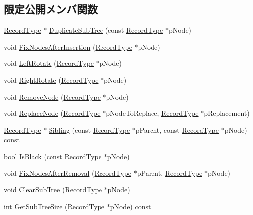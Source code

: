 \subsection*{限定公開メンバ関数}
\begin{DoxyCompactItemize}
\item 
\hyperlink{class_fbx_red_black_tree_1_1_record_type}{Record\+Type} $\ast$ \hyperlink{class_fbx_red_black_tree_a11fd717eeb71ff16ef10114a00cc7888}{Duplicate\+Sub\+Tree} (const \hyperlink{class_fbx_red_black_tree_1_1_record_type}{Record\+Type} $\ast$p\+Node)
\item 
void \hyperlink{class_fbx_red_black_tree_ac553d028cbea6ac90b0b42d161b5843c}{Fix\+Nodes\+After\+Insertion} (\hyperlink{class_fbx_red_black_tree_1_1_record_type}{Record\+Type} $\ast$p\+Node)
\item 
void \hyperlink{class_fbx_red_black_tree_a91db157ad267d601b364522e823bb435}{Left\+Rotate} (\hyperlink{class_fbx_red_black_tree_1_1_record_type}{Record\+Type} $\ast$p\+Node)
\item 
void \hyperlink{class_fbx_red_black_tree_a390eaccc303de294803e1fd2272cbc73}{Right\+Rotate} (\hyperlink{class_fbx_red_black_tree_1_1_record_type}{Record\+Type} $\ast$p\+Node)
\item 
void \hyperlink{class_fbx_red_black_tree_af0e3ffcca91f083d958bec08fbd20100}{Remove\+Node} (\hyperlink{class_fbx_red_black_tree_1_1_record_type}{Record\+Type} $\ast$p\+Node)
\item 
void \hyperlink{class_fbx_red_black_tree_a80886c4cbd8f7a9f492f9b52effbdfa9}{Replace\+Node} (\hyperlink{class_fbx_red_black_tree_1_1_record_type}{Record\+Type} $\ast$p\+Node\+To\+Replace, \hyperlink{class_fbx_red_black_tree_1_1_record_type}{Record\+Type} $\ast$p\+Replacement)
\item 
\hyperlink{class_fbx_red_black_tree_1_1_record_type}{Record\+Type} $\ast$ \hyperlink{class_fbx_red_black_tree_a634b41949b2cdef5488abcb444f896c6}{Sibling} (const \hyperlink{class_fbx_red_black_tree_1_1_record_type}{Record\+Type} $\ast$p\+Parent, const \hyperlink{class_fbx_red_black_tree_1_1_record_type}{Record\+Type} $\ast$p\+Node) const
\item 
bool \hyperlink{class_fbx_red_black_tree_ab737a7f1323fcfce74268072f266ea28}{Is\+Black} (const \hyperlink{class_fbx_red_black_tree_1_1_record_type}{Record\+Type} $\ast$p\+Node)
\item 
void \hyperlink{class_fbx_red_black_tree_a3324d8304143f4d05160eab2aee1c6fa}{Fix\+Nodes\+After\+Removal} (\hyperlink{class_fbx_red_black_tree_1_1_record_type}{Record\+Type} $\ast$p\+Parent, \hyperlink{class_fbx_red_black_tree_1_1_record_type}{Record\+Type} $\ast$p\+Node)
\item 
void \hyperlink{class_fbx_red_black_tree_af958bdb74b133aff94c460e956b78859}{Clear\+Sub\+Tree} (\hyperlink{class_fbx_red_black_tree_1_1_record_type}{Record\+Type} $\ast$p\+Node)
\item 
int \hyperlink{class_fbx_red_black_tree_a1eacc00900b47600528a379ed8882d0c}{Get\+Sub\+Tree\+Size} (\hyperlink{class_fbx_red_black_tree_1_1_record_type}{Record\+Type} $\ast$p\+Node) const
\end{DoxyCompactItemize}
